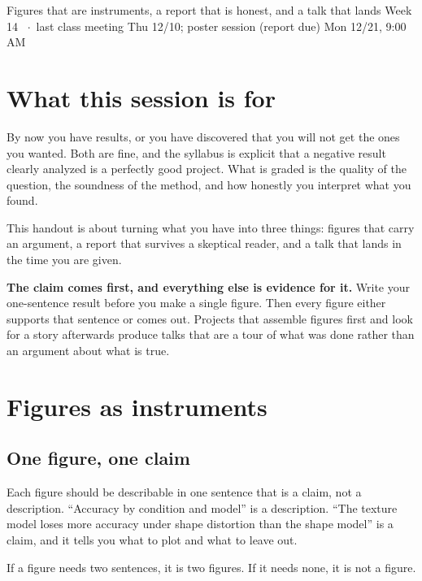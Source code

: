 \documentclass[11pt]{article}
\begin{document}
  {Figures that are instruments, a report that is honest, and a talk that lands}
  {Week 14 \ $\cdot$\ last class meeting Thu 12/10; poster session (report due) Mon 12/21, 9:00\,AM}

\section*{What this session is for}

By now you have results, or you have discovered that you will not get the ones
you wanted. Both are fine, and the syllabus is explicit that a negative result
clearly analyzed is a perfectly good project. What is graded is the quality of
the question, the soundness of the method, and how honestly you interpret what
you found.

This handout is about turning what you have into three things: figures that
carry an argument, a report that survives a skeptical reader, and a talk that
lands in the time you are given.

\begin{keybox}
 \textbf{The claim comes first, and everything else is
evidence for it.} Write your one-sentence result before you make a single
figure. Then every figure either supports that sentence or comes out. Projects
that assemble figures first and look for a story afterwards produce talks that
are a tour of what was done rather than an argument about what is true.
\end{keybox}

\section{Figures as instruments}

\subsection{One figure, one claim}

Each figure should be describable in one sentence that is a claim, not a
description. ``Accuracy by condition and model'' is a description. ``The texture
model loses more accuracy under shape distortion than the shape model'' is a
claim, and it tells you what to plot and what to leave out.

If a figure needs two sentences, it is two figures. If it needs none, it is not a
figure.
\end{document}
